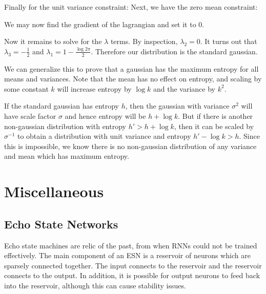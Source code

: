 \documentclass[12pt]{article}
\begin{document}
Finally for the unit variance constraint:
Next, we have the zero mean constraint:

We may now find the gradient of the lagrangian and set it to 0.

Now it remains to solve for the $\lambda$ terms. By inspection, $\lambda_2 = 0$. It turns out that $\lambda_3 = -\frac{1}{2}$ and $\lambda_1 = 1-\frac{\log 2 \pi}{2}$. Therefore our distribution is the standard gaussian.

We can generalize this to prove that a gaussian has the maximum entropy for all means and variances. Note that the mean has no effect on entropy, and scaling by some constant $k$ will increase entropy by $\log k$ and the variance by $k^2$.

If the standard gaussian has entropy $h$, then the gaussian with variance $\sigma^2$ will have scale factor $\sigma$ and hence entropy will be $h+\log k$. But if there is another non-gaussian distribution with entropy $h' > h+\log k$, then it can be scaled by $\sigma^{-1}$ to obtain a distribution with unit variance and entropy $h' - \log k > h$. Since this is impossible, we know there is no non-gaussian distribution of any variance and mean which has maximum entropy.

\section{Miscellaneous}

\subsection{Echo State Networks}

Echo state machines are relic of the past, from when RNNs could not be trained effectively. The main component of an ESN is a reservoir of neurons which are sparsely connected together. The input connects to the reservoir and the reservoir connects to the output. In addition, it is possible for output neurons to feed back into the reservoir, although this can cause stability issues.
\end{document}
